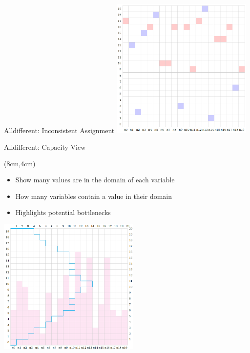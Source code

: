 \documentclass[dvipsnames,aspectratio=169]{beamer}
\begin{document}
\begin{frame}{Alldifferent: Inconsistent Assignment}
\includegraphics[width=7cm]{images/aldifferentconflict.PNG}    
\end{frame}

\begin{frame}{Alldifferent: Capacity View}
\begin{textblock*}{7cm}(8cm,4cm)
\begin{itemize}
    \item Show many values are in the domain of each variable
    \item How many variables contain a value in their domain
    \item Highlights potential bottlenecks
\end{itemize}
\end{textblock*}
\includegraphics[width=7cm]{images/alldifferentcapacity.PNG}    
\end{frame}
\end{document}
